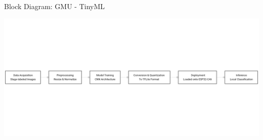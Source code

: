 \documentclass{beamer}
\begin{document}
\begin{frame} {Block Diagram: GMU - TinyML}

    \begin{center}

        \includegraphics[width = \textwidth]{tinyml.png}

    \end{center}

\end{frame}
\end{document}
